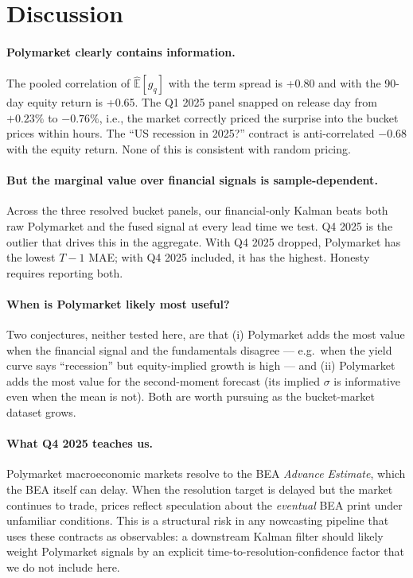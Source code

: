 \documentclass{article}
\begin{document}
\section{Discussion}
\label{sec:disc}

\paragraph{Polymarket clearly contains information.} The pooled correlation of
$\widehat{\mathbb{E}}[g_q]$ with the term spread is +0.80 and with the 90-day equity
return is +0.65. The Q1 2025 panel snapped on release day from $+0.23\%$ to $-0.76\%$,
i.e., the market correctly priced the surprise into the bucket prices within hours. The
``US recession in 2025?'' contract is anti-correlated $-0.68$ with the equity return.
None of this is consistent with random pricing.

\paragraph{But the marginal value over financial signals is sample-dependent.} Across the
three resolved bucket panels, our financial-only Kalman beats both raw Polymarket and the
fused signal at every lead time we test. Q4 2025 is the outlier that drives this in the
aggregate. With Q4 2025 dropped, Polymarket has the lowest $T{-}1$ MAE; with Q4 2025
included, it has the highest. Honesty requires reporting both.

\paragraph{When is Polymarket likely most useful?} Two conjectures, neither tested here,
are that (i) Polymarket adds the most value when the financial signal and the fundamentals
disagree --- e.g.\ when the yield curve says ``recession'' but equity-implied growth is
high --- and (ii) Polymarket adds the most value for the second-moment forecast (its
implied $\sigma$ is informative even when the mean is not). Both are worth pursuing as
the bucket-market dataset grows.

\paragraph{What Q4 2025 teaches us.} Polymarket macroeconomic markets resolve to the BEA
\emph{Advance Estimate}, which the BEA itself can delay. When the resolution target is
delayed but the market continues to trade, prices reflect speculation about the
\emph{eventual} BEA print under unfamiliar conditions. This is a structural risk in any
nowcasting pipeline that uses these contracts as observables: a downstream Kalman filter
should likely weight Polymarket signals by an explicit time-to-resolution-confidence
factor that we do not include here.
\end{document}
